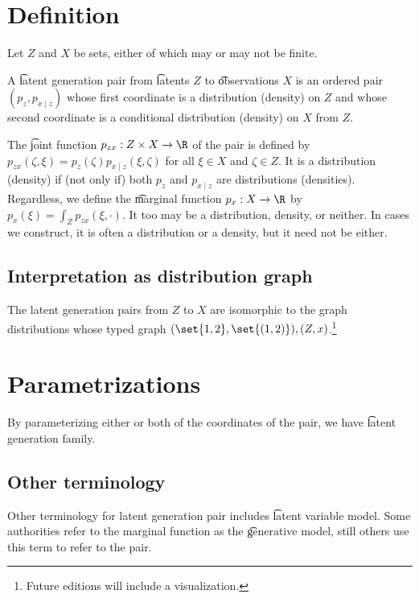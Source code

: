 

\section*{Definition}

Let $Z$ and $X$ be sets, either of which may or may not be finite.

A \t{latent generation pair} from \t{latents} $Z$ to \t{observations} $X$ is an ordered pair $(p_z, p_{x \mid z})$ whose first coordinate is a distribution (density) on $Z$ and whose second coordinate is a conditional distribution (density) on $X$ from $Z$.

The \t{joint function} $p_{zx}: Z \times X \to \R $ of the pair is defined by $p_{zx}(\zeta , \xi ) = p_{z}(\zeta )p_{x \mid z}(\xi , \zeta )$ for all $\xi  \in X$ and $\zeta  \in Z$.
It is a distribution (density) if (not only if) both $p_{z}$ and $p_{x \mid z}$ are distributions (densities).
Regardless, we define the \t{marginal function} $p_x: X \to \R $ by $p_x(\xi ) = \int_Z p_{zx}(\xi , \cdot )$.
It too may be a distribution, density, or neither.
In cases we construct, it is often a distribution or a density, but it need not be either.

\subsection*{Interpretation as distribution graph}

The latent generation pairs from $Z$ to $X$ are isomorphic to the graph distributions whose typed graph $(\set{1, 2}, \set{(1,2)}), (Z, x)$.\footnote{Future editions will include a visualization.}

\section*{Parametrizations}

By parameterizing either or both of the coordinates of the pair, we have \t{latent generation family}.

\subsection*{Other terminology}

Other terminology for latent generation pair includes \t{latent variable model}.
Some authorities refer to the marginal function as the \t{generative model}, still others use this term to refer to the pair.


\blankpage